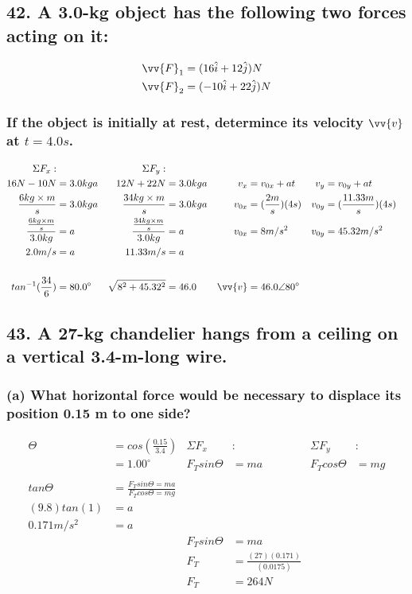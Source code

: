 \documentclass[12pt,a4paper,english]{article}
\begin{document}
\begin{flushleft}
  \subsection{42. A 3.0-kg object has the following two forces acting on it:}
  \begin{align*}
    \vv{F}_1&=(16\hat{i}+12\hat{j})N\\
    \vv{F}_2&=(-10\hat{i}+22\hat{j})N
  \end{align*}
  \subsubsection{If the object is initially at rest, determince its velocity $\vv{v}$ at $t=4.0s$.}
  \begin{align*}
    \Sigma F_x:&  &   \Sigma F_y:&\\
    16N-10N&=3.0kga 
       & 12N+22N&=3.0kga
       &v_x&=v_{0x}+at
       &v_y&=v_{0y}+at
       \\
    \frac{6kg\times m}{s}&=3.0kga
       &\frac{34kg\times m}{s}&=3.0kga
       &v_{0x}&=(\frac{2m}{s})(4s)
       &v_{0y}&=(\frac{11.33m}{s})(4s)
       \\
    \frac{\frac{6kg\times m}{s}}{3.0kg}&=a
       &\frac{\frac{34kg\times m}{s}}{3.0kg}&=a
       &v_{0x}&=8m/s^2
       &v_{0y}&=45.32m/s^2
       \\
    2.0m/s&=a
       &11.33m/s&=a
       \\
       \\
    tan^{-1}(\frac{34}{6})&=80.0^\circ 
       &\sqrt{8^2+45.32^2}&=46.0
       &\vv{v}&=46.0\angle 80^\circ
  \end{align*}
  \subsection{43. A 27-kg chandelier hangs from a ceiling on a vertical 3.4-m-long wire.}
  \subsubsection{(a) What horizontal force would be necessary to displace its position 0.15 m to one side?}
  \begin{align*}
    \Theta&=cos(\frac{0.15}{3.4})
      &\Sigma F_x&:
      &\Sigma F_y&:
    \\
    &=1.00^\circ
      &F_Tsin\Theta&=ma
      &F_Tcos\Theta&=mg
    \\
    \\
    tan\Theta&=\frac{F_Tsin\Theta=ma}{F_Tcos\Theta=mg}
    \\
    (9.8)tan(1)&=a
    \\
    0.171m/s^2&=a
    \\
    &&F_Tsin\Theta&=ma
    \\
    &&F_T&=\frac{(27)(0.171)}{(0.0175)}
    \\
    &&F_T&=264N
  \end{align*}

\end{flushleft}
\end{document}
